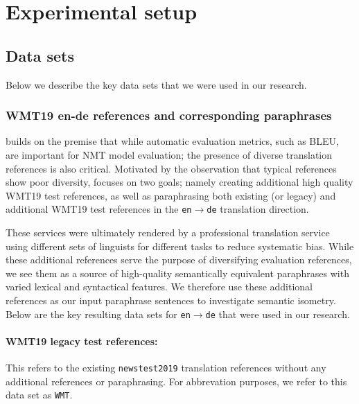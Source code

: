 \documentclass[11pt,a4paper]{article}
\begin{document}

\section{Experimental setup}

\subsection{Data sets}

Below we describe the key data sets that we were used in our research.

\subsubsection{WMT19 en-de references and corresponding paraphrases}

\citet{freitag-bleu-paraphrase-references-2020} builds on the premise that while automatic evaluation metrics, such as BLEU, are important for NMT model evaluation; the presence of diverse translation references is also critical. Motivated by the observation that typical references show poor diversity, \citet{freitag-bleu-paraphrase-references-2020} focuses on two goals; namely creating additional high quality WMT19 test references, as well as paraphrasing both existing (or legacy) and additional WMT19 test references in the \texttt{en$\rightarrow$de} translation direction.

These services were ultimately rendered by a professional translation service using different sets of linguists for different tasks to reduce systematic bias. While these additional references serve the purpose of diversifying evaluation references, we see them as a source of high-quality semantically equivalent paraphrases with varied lexical and syntactical features. We therefore use these additional references as our input paraphrase sentences to investigate semantic isometry. Below are the key resulting data sets for \texttt{en$\rightarrow$de} that were used in our research.

\paragraph{WMT19 legacy test references:} This refers to the existing \texttt{newstest2019} translation references without any additional references or paraphrasing. For abbrevation purposes, we refer to this data set as \texttt{WMT}. 
\end{document}
